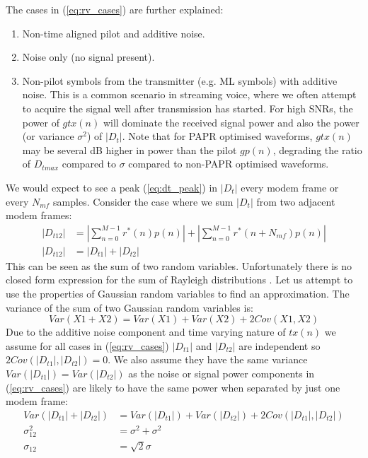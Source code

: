 \documentclass{article}
\begin{document}
The cases in (\ref{eq:rv_cases}) are further explained:
\begin{enumerate}
\item Non-time aligned pilot and additive noise.
\item Noise only (no signal present).
\item Non-pilot symbols from the transmitter (e.g. ML symbols) with additive noise. This is a common scenario in streaming voice, where we often attempt to acquire the signal well after transmission has started. For high SNRs, the power of $gtx(n)$ will dominate the received signal power and also the power (or variance $\sigma^2$) of $|D_t|$.  Note that for PAPR optimised waveforms, $gtx(n)$ may be several dB higher in power than the pilot $gp(n)$, degrading the ratio of $D_{tmax}$ compared to $\sigma$ compared to non-PAPR optimised waveforms.
\end{enumerate}
We would expect to see a peak (\ref{eq:dt_peak}) in $|D_t|$ every modem frame or every $N_{mf}$ samples. Consider the case where we sum $|D_t|$ from two adjacent modem frames:
\begin{equation}
\begin{split}
|D_{t12}| &= \left|\sum_{n=0}^{M-1} r^*(n)p(n)\right| + \left|\sum_{n=0}^{M-1} r^*(n+N_{mf})p(n)\right| \\
|D_{t12}| &= |D_{t1}| + |D_{t2}|
\end{split}
\end{equation}
This can be seen as the sum of two random variables. Unfortunately there is no closed form expression for the sum of Rayleigh distributions \cite{1388722}. Let us attempt to use the properties of Gaussian random variables to find an approximation. The variance of the sum of two Gaussian random variables is:
\begin{equation}
Var(X1+X2) = Var(X1) + Var(X2) + 2Cov(X1,X2)
\end{equation}
Due to the additive noise component and time varying nature of $tx(n)$ we assume for all cases in (\ref{eq:rv_cases}) $|D_{t1}|$ and $|D_{t2}|$ are independent so $2Cov(|D_{t1}|,|D_{t2}|)=0$.  We also assume they have the same variance $Var(|D_{t1}|) = Var(|D_{t2}|)$ as the noise or signal power components in (\ref{eq:rv_cases}) are likely to have the same power when separated by just one modem frame:
\begin{equation}
\begin{split}
Var(|D_{t1}|+|D_{t2}|) & = Var(|D_{t1}|) + Var(|D_{t2}|) + 2Cov(|D_{t1}|,|D_{t2}|) \\
\sigma_{12}^2 &= \sigma^2 + \sigma^2 \\
\sigma_{12} &= \sqrt{2}\sigma
\end{split}
\end{equation}
\end{document}
